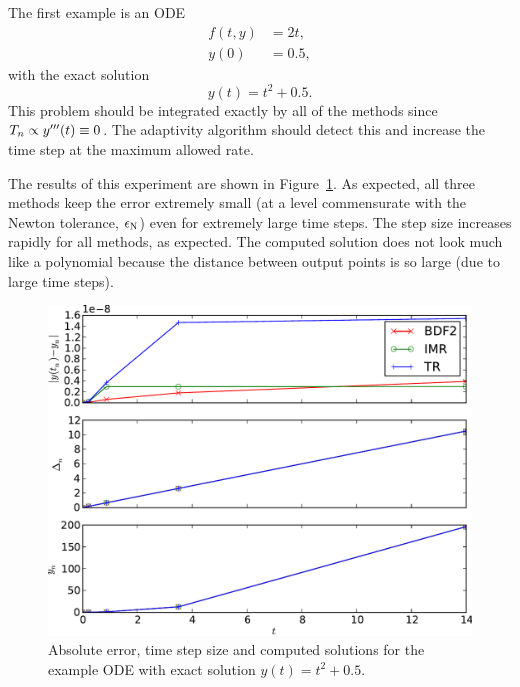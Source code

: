 The first example is an ODE
\begin{equation}
  \begin{aligned}
    f(t,y) &= 2t, \\
    y(0) &= 0.5,
  \end{aligned}
\end{equation}
with the exact solution
\begin{equation}
  y(t) = t^2 + 0.5.
\end{equation}
This problem should be integrated exactly by all of the methods since $T_n \propto y'''(t) \equiv 0$.
The adaptivity algorithm should detect this and increase the time step at the maximum allowed rate.

The results of this experiment are shown in Figure~\ref{fig:imr-poly2-example}.
As expected, all three methods keep the error extremely small (at a level commensurate with the Newton tolerance, $\epsilon_{\mathrm{N}}$) even for extremely large time steps.
The step size increases rapidly for all methods, as expected.
The computed solution does not look much like a polynomial because the distance between output points is so large (due to large time steps).

\begin{figure}
  \centering
  \includegraphics[width=1\textwidth]{plots/aimr_odes_traces/poly2-errornormsvs-dtsvs-tracevaluesvstimes}
  \caption{Absolute error, time step size and computed solutions for the example ODE with exact solution $y(t) = t^2 + 0.5$.}
  \label{fig:imr-poly2-example}
\end{figure}


